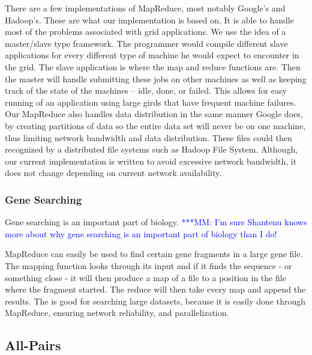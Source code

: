 \documentclass[conference,final]{IEEEtran}
\newcommand{\michaelnote}[1]{ {\textcolor{blue} { ***MM: #1 }}}
\newcommand{\michaelnote}[1]{ {\textcolor{blue} { ***MM: #1 }}}
\begin{document}
There are a few implementations of MapReduce, most notably Google's and
Hadoop's.  These are what our implementation is based on.  It is able
to handle most of the problems associated with grid applications.  We use
the idea of a master/slave type framework.  The programmer would compile
different slave applications for every different type of machine he 
would expect to encounter in the grid.  The slave application is
where the map and reduce functions are.  Then the master will handle
submitting these jobs on other machines as well as keeping track of
the state of the machines -- idle, done, or failed.  This allows for
easy running of an application using large girds that have frequent
machine failures.  Our MapReduce also handles data distribution in the
same manner Google does, by creating partitions of data so the entire
data set will never be on one machine, thus limiting network bandwidth
and data distribution.  These files could then recognized by a
distributed file systems such as Hadoop File System.  Although, our
current implementation is written to avoid excessive network
bandwidth, it does not change depending on current network
availability.

\subsubsection{Gene Searching}

Gene searching is an important part of biology.  \michaelnote{I'm sure
  Shantenu knows more about why gene searching is an important part of
  biology than I do!}

MapReduce can easily be used to find certain gene fragments in a large
gene file.  The mapping function looks through its input and if it
finds the sequence - or something close - it will then produce a map
of a file to a position in the file where the fragment started.  The
reduce will then take every map and append the results.  The is good
for searching large datasets, because it is easily done through
MapReduce, ensuring network reliability, and parallelization.

\subsection{All-Pairs}
\end{document}
